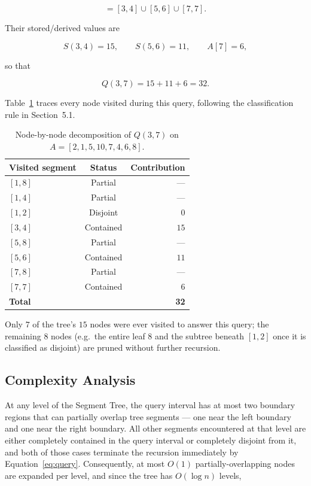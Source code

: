 \documentclass[11pt]{article}
\begin{document}
\begin{equation}
[3,7] = [3,4] \cup [5,6] \cup [7,7].
\end{equation}

Their stored/derived values are

\begin{equation}
S(3,4) = 15, \qquad S(5,6) = 11, \qquad A[7] = 6,
\end{equation}

so that

\begin{equation}
Q(3,7) = 15 + 11 + 6 = 32.
\end{equation}

Table~\ref{tab:decomp} traces every node visited during this query, following the classification rule in Section~5.1.

\begin{table}[h]
\centering
\caption{Node-by-node decomposition of $Q(3,7)$ on $A=[2,1,5,10,7,4,6,8]$.}
\label{tab:decomp}
\begin{tabular}{lcr}
\toprule
\textbf{Visited segment} & \textbf{Status} & \textbf{Contribution} \\
\midrule
$[1,8]$ & Partial   & --- \\
$[1,4]$ & Partial   & --- \\
$[1,2]$ & Disjoint  & $0$ \\
$[3,4]$ & Contained & $15$ \\
$[5,8]$ & Partial   & --- \\
$[5,6]$ & Contained & $11$ \\
$[7,8]$ & Partial   & --- \\
$[7,7]$ & Contained & $6$ \\
\midrule
\textbf{Total} & & \textbf{32} \\
\bottomrule
\end{tabular}
\end{table}

Only $7$ of the tree's $15$ nodes were ever visited to answer this query; the remaining $8$ nodes (e.g.\ the entire leaf $8$ and the subtree beneath $[1,2]$ once it is classified as disjoint) are pruned without further recursion.

\subsection{Complexity Analysis}
\label{sec:overlap-argument}
At any level of the Segment Tree, the query interval has at most two boundary regions that can partially overlap tree segments --- one near the left boundary and one near the right boundary. All other segments encountered at that level are either completely contained in the query interval or completely disjoint from it, and both of those cases terminate the recursion immediately by Equation~\eqref{eq:query}. Consequently, at most $O(1)$ partially-overlapping nodes are expanded per level, and since the tree has $O(\log n)$ levels,
\end{document}
